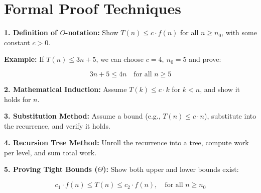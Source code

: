 \documentclass{article}
\begin{document}
\section{Formal Proof Techniques}

\textbf{1. Definition of $O$-notation:}  
Show $T(n) \le c \cdot f(n)$ for all $n \ge n_0$, with some constant $c > 0$.

\textbf{Example:} If $T(n) \le 3n + 5$, we can choose $c = 4,\ n_0 = 5$ and prove:

\[
3n + 5 \le 4n \quad \text{for all } n \ge 5
\]

\textbf{2. Mathematical Induction:}  
Assume $T(k) \le c \cdot k$ for $k < n$, and show it holds for $n$.

\textbf{3. Substitution Method:}  
Assume a bound (e.g., $T(n) \le c \cdot n$), substitute into the recurrence, and verify it holds.

\textbf{4. Recursion Tree Method:}  
Unroll the recurrence into a tree, compute work per level, and sum total work.

\textbf{5. Proving Tight Bounds ($\Theta$):}  
Show both upper and lower bounds exist:

\[
c_1 \cdot f(n) \le T(n) \le c_2 \cdot f(n), \quad \text{for all } n \ge n_0
\]
\end{document}
